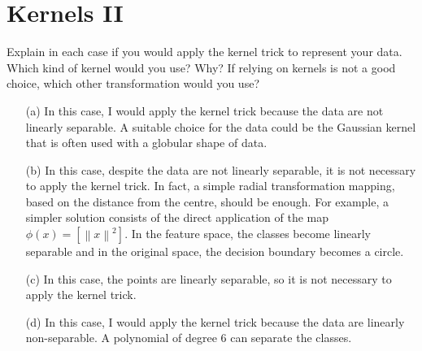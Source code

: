 \section{Kernels II}

Explain in each case if you would apply the kernel trick to represent your 
data. Which kind of kernel would you use? Why? If relying on kernels is not 
a good choice, which other transformation would you use?
\begin{itemize}
	\item[(a)] In this case, I would apply the kernel trick because the data 
	are not	linearly separable.
	A suitable choice for the data could be the Gaussian kernel that is often 
	used with a globular shape of data.
	
	\item[(b)] In this case, despite the data are not linearly separable, it is 
	not necessary to apply the kernel trick. In fact, a simple radial 
	transformation mapping, based on the distance from the centre, should be 
	enough. 
	For example, a simpler solution consists of the direct application of the 
	map $\phi(x)=[{\left\| x\right\|}^{2}]$. In the feature space, the 
	classes become linearly separable and in the original space, the decision 
	boundary becomes a circle.

	\item[(c)] In this case, the points are linearly separable, so it is not 
	necessary to apply the kernel trick.  
	
	\item[(d)] In this case, I would apply the kernel trick because the data 
	are linearly non-separable. A polynomial of degree $6$ can separate the 
	classes.
	
\end{itemize}

